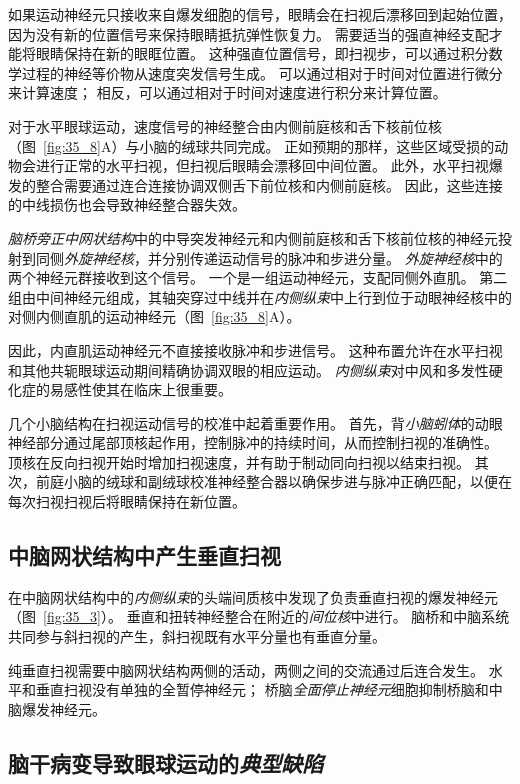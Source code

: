 如果运动神经元只接收来自爆发细胞的信号，眼睛会在扫视后漂移回到起始位置，因为没有新的位置信号来保持眼睛抵抗弹性恢复力。
需要适当的强直神经支配才能将眼睛保持在新的眼眶位置。
这种强直位置信号，即扫视步，可以通过积分数学过程的神经等价物从速度突发信号生成。
可以通过相对于时间对位置进行微分来计算速度；
相反，可以通过相对于时间对速度进行积分来计算位置。


对于水平眼球运动，速度信号的神经整合由内侧前庭核和舌下核前位核（图~\ref{fig:35_8}A）与小脑的绒球共同完成。
正如预期的那样，这些区域受损的动物会进行正常的水平扫视，但扫视后眼睛会漂移回中间位置。
此外，水平扫视爆发的整合需要通过连合连接协调双侧舌下前位核和内侧前庭核。
因此，这些连接的中线损伤也会导致神经整合器失效。


\textit{脑桥旁正中网状结构}中的中导突发神经元和内侧前庭核和舌下核前位核的神经元投射到同侧\textit{外旋神经核}，并分别传递运动信号的脉冲和步进分量。
\textit{外旋神经核}中的两个神经元群接收到这个信号。
一个是一组运动神经元，支配同侧外直肌。
第二组由中间神经元组成，其轴突穿过中线并在\textit{内侧纵束}中上行到位于动眼神经核中的对侧内侧直肌的运动神经元（图~\ref{fig:35_8}A）。


因此，内直肌运动神经元不直接接收脉冲和步进信号。
这种布置允许在水平扫视和其他共轭眼球运动期间精确协调双眼的相应运动。
\textit{内侧纵束}对中风和多发性硬化症的易感性使其在临床上很重要。


几个小脑结构在扫视运动信号的校准中起着重要作用。
首先，背\textit{小脑蚓体}的动眼神经部分通过尾部顶核起作用，控制脉冲的持续时间，从而控制扫视的准确性。
顶核在反向扫视开始时增加扫视速度，并有助于制动同向扫视以结束扫视。
其次，前庭小脑的绒球和副绒球校准神经整合器以确保步进与脉冲正确匹配，以便在每次扫视扫视后将眼睛保持在新位置。



\subsection{中脑网状结构中产生垂直扫视}

在中脑网状结构中的\textit{内侧纵束}的头端间质核中发现了负责垂直扫视的爆发神经元（图~\ref{fig:35_3}）。
垂直和扭转神经整合在附近的\textit{间位核}中进行。
脑桥和中脑系统共同参与斜扫视的产生，斜扫视既有水平分量也有垂直分量。


纯垂直扫视需要中脑网状结构两侧的活动，两侧之间的交流通过后连合发生。
水平和垂直扫视没有单独的全暂停神经元；
桥脑\textit{全面停止神经元}细胞抑制桥脑和中脑爆发神经元。



\subsection{脑干病变导致眼球运动的\textit{典型缺陷}}


